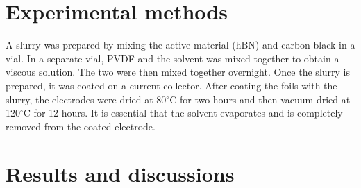 \section{Experimental methods}
A slurry was prepared by mixing the active material (hBN) and carbon black in a vial. In a separate vial, PVDF and the solvent was mixed together to obtain a viscous solution. The two were then mixed together overnight. Once the slurry is prepared, it was coated on a current collector. After coating the foils with the slurry, the electrodes were dried at 80$^{\circ}$C for two hours and then vacuum dried at 120$^{\circ}$C for 12 hours. It is essential that the solvent evaporates and is completely removed from the coated electrode.  
\section{Results and discussions}
